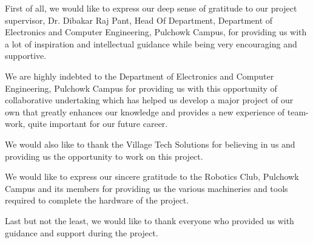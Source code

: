 \thispagestyle{plain}
\begin{center}
	\large
	\vspace{0.4cm}	
\end{center}

First of all, we would like to express our deep sense of gratitude to our project supervisor, Dr. Dibakar Raj Pant, Head Of Department, Department of Electronics and Computer Engineering, Pulchowk Campus, for providing us with a lot of inspiration and intellectual guidance while being very encouraging and supportive.

We are highly indebted to the Department of Electronics and Computer Engineering, Pulchowk Campus for providing us with this opportunity of collaborative undertaking which has helped us develop a major project of our own that greatly enhances our knowledge and provides a new experience of team-work, quite important for our future career.

We would also like to thank the Village Tech Solutions for believing in us and providing us the opportunity to work on this project.

We would like to express our sincere gratitude to the Robotics Club, Pulchowk Campus and its members for providing us the various machineries and tools required to complete the hardware of the project.

Last but not the least, we would like to thank everyone who provided us with guidance and support during the project.
